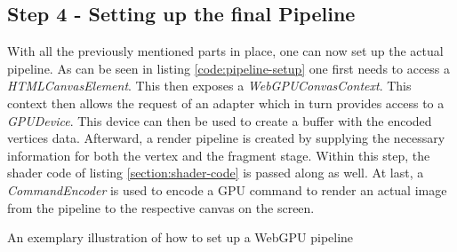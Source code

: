 \subsection{Step 4 - Setting up the final Pipeline}

With all the previously mentioned parts in place, one can now set up the actual pipeline. As can be seen in listing \ref*{code:pipeline-setup} one first needs to access a \emph{HTMLCanvasElement}. This 
then exposes a \emph{WebGPUConvasContext}. This context then allows the request of an adapter which in turn provides access to a \emph{GPUDevice}.
This device can then be used to create a buffer with the encoded vertices data. Afterward, a render pipeline is created by supplying the necessary information for both the vertex and the fragment stage.
Within this step, the shader code of listing \ref*{section:shader-code} is passed along as well. At last, a \emph{CommandEncoder} is used to encode a GPU command to render an actual image from the pipeline to the respective canvas on the screen. 

\begin{listing}

  \centering

  \caption[Code Snippet: WebGPU Pipeline]
  {
    An exemplary illustration of how to set up a WebGPU pipeline
  }
  \label{code:pipeline-setup}
\end{listing}


